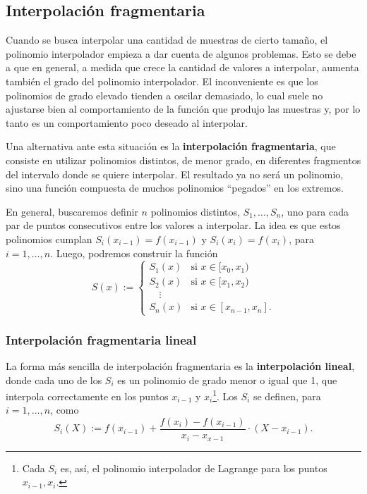 \subsection{Interpolación fragmentaria}
Cuando se busca interpolar una cantidad de muestras de cierto tamaño, el
polinomio interpolador empieza a dar cuenta de algunos problemas. Esto se debe
a que en general, a medida que crece la cantidad de valores a interpolar,
aumenta también el grado del polinomio interpolador. El inconveniente es que
los polinomios de grado elevado tienden a oscilar demasiado, lo cual suele no
ajustarse bien al comportamiento de la función que produjo las muestras y, por
lo tanto es un comportamiento poco deseado al interpolar.

Una alternativa ante esta situación es la \textbf{interpolación fragmentaria},
que consiste en utilizar polinomios distintos, de menor grado, en diferentes
fragmentos del intervalo donde se quiere interpolar. El resultado ya no será
un polinomio, sino una función compuesta de muchos polinomios ``pegados'' en
los extremos.

En general, buscaremos definir $n$ polinomios distintos, $S_1, \dots, S_n$,
uno para cada par de puntos consecutivos entre los valores a interpolar. La
idea es que estos polinomios cumplan $S_i(x_{i-1}) = f(x_{i-1})$ y $S_i(x_i)
= f(x_i)$, para $i = 1, \dots, n$. Luego, podremos construir la función
\[ S(x) := \begin{cases}
    S_1(x) & \text{si } x \in [x_0,x_1) \\
    S_2(x) & \text{si } x \in [x_1,x_2) \\
    \quad \vdots \\
    S_n(x) & \text{si } x \in [x_{n-1}, x_n].
\end{cases} \]

\subsubsection{Interpolación fragmentaria lineal}

La forma más sencilla de interpolación fragmentaria es la
\textbf{interpolación lineal}, donde cada uno de los $S_i$ es un polinomio de
grado menor o igual que 1, que interpola correctamente en los puntos $x_{i-1}$
y $x_i$\footnote{Cada $S_i$ es, así, el polinomio interpolador de Lagrange
para los puntos $x_{i-1}, x_i$.}. Los $S_i$ se definen, para $i = 1, \dots,
n$, como
\[ S_i(X) := f(x_{i-1})
    + \frac{f(x_i) - f(x_{i-1})}{x_i-x_{x-1}} \cdot (X - x_{i-1}). \]


